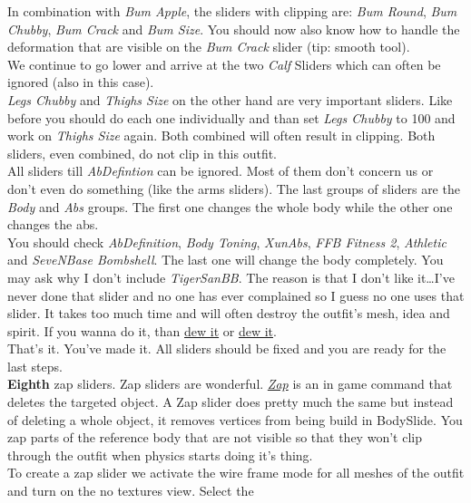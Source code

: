 In combination with \textit{Bum Apple}, the sliders with clipping are: \textit{Bum Round}, \textit{Bum Chubby}, 
\textit{Bum Crack} and \textit{Bum Size}. You should now also know how to handle the deformation that are visible on the 
\textit{Bum Crack} slider (tip: smooth tool).\\
We continue to go lower and arrive at the two \textit{Calf} Sliders which can often be ignored (also in this case).\\
\textit{Legs Chubby} and \textit{Thighs Size} on the other hand are very important sliders. Like before you should do each one 
individually and than set \textit{Legs Chubby} to 100 and work on \textit{Thighs Size} again. Both combined will often result in 
clipping. Both sliders, even combined, do not clip in this outfit.\\
All sliders till \textit{AbDefintion} can be ignored. Most of them don't concern us or don't even do something (like the arms sliders).
The last groups of sliders are the \textit{Body} and \textit{Abs} groups. The first one changes the whole body while the other one 
changes the abs.\\
You should check \textit{AbDefinition}, \textit{Body Toning}, \textit{XunAbs}, \textit{FFB Fitness 2}, \textit{Athletic} and 
\textit{SeveNBase Bombshell}. The last one will change the body completely. You may ask why I don't include \textit{TigerSanBB}.
The reason is that I don't like it\dots I've never done that slider and no one has ever complained so I guess no one uses that 
slider. It takes too much time and will often destroy the outfit's mesh, idea and spirit. If you wanna do it, 
than \href{https://www.youtube.com/watch?v=VqQJ2wk6ge4&t=21s}{dew it} or \href{https://www.youtube.com/watch?v=dmQDVHjTveI}{dew it}.\\
That's it. You've made it. All sliders should be fixed and you are ready for the last steps.\\
\textbf{Eighth} zap sliders. Zap sliders are wonderful. \href{https://fallout4commands.com/commands/zap-5786997}{\textit{Zap}}
is an in game command that deletes the targeted object. A Zap slider does pretty much the same but instead of deleting a whole object,
it removes vertices from being build in BodySlide. You zap parts of the reference body that are not visible so that they won't clip 
through the outfit when physics starts doing it's thing.\\
To create a zap slider we activate the wire frame mode for all meshes of the outfit and turn on the no textures view. Select the 
